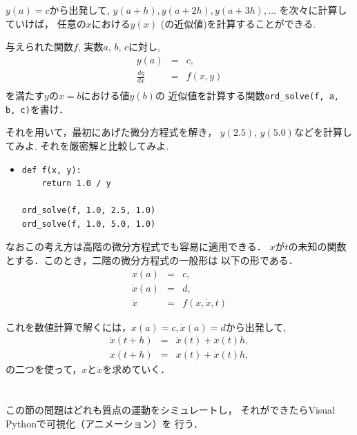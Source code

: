 \documentclass[10pt,dvipdfmx]{article}
\begin{document}
$y(a)=c$から出発して, 
$y(a + h), y(a + 2h), y(a + 3h), \ldots$
を次々に計算していけば，
任意の$x$における$y(x)$ (の近似値)を計算することができる.

与えられた関数$f$, 実数$a$, $b$, $c$に対し, 
\begin{eqnarray}
y(a) & = & c, \\
\frac{dy}{dx} & = & f(x, y) \\
\end{eqnarray}
を満たす$y$の$x = b$における値$y(b)$の
近似値を計算する関数{\tt ord\_solve(f, a, b, c)}を書け．

それを用いて，最初にあげた微分方程式を解き，
$y(2.5)$, $y(5.0)$などを計算してみよ. 
それを厳密解と比較してみよ. 

\begin{itemize}
\item []
\begin{lstlisting}
def f(x, y):
    return 1.0 / y

ord_solve(f, 1.0, 2.5, 1.0)
ord_solve(f, 1.0, 5.0, 1.0)
\end{lstlisting}
\end{itemize}

なおこの考え方は高階の微分方程式でも容易に適用できる．
$x$が$t$の未知の関数とする．このとき，二階の微分方程式の一般形は
以下の形である．
\begin{eqnarray}
x(a)       & = & c, \\
\dot{x}(a) & = & d, \\
\ddot{x}   & = & f(x, \dot{x}, t)
\end{eqnarray}

これを数値計算で解くには，$x(a)=c, \dot{x}(a)=d$から出発して, 
\begin{eqnarray}
\dot{x}(t + h) & = & \dot{x}(t) + \ddot{x}(t) h, \\
x(t + h)       & = & x(t) + \dot{x}(t) h,
\end{eqnarray}
の二つを使って，$x$と$\dot{x}$を求めていく．

\newpage
\section{}

この節の問題はどれも質点の運動をシミュレートし，
それができたらVisual Pythonで可視化（アニメーション）を
行う．
\end{document}

